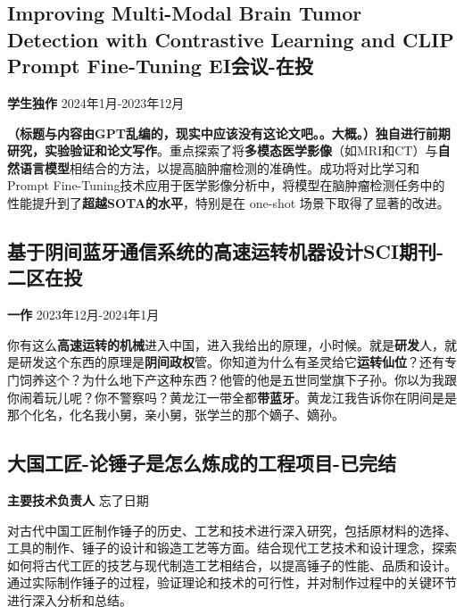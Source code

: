 \documentclass[11pt]{article}
\begin{document}
    \vspace{1em}                %
    \subsection{Improving Multi-Modal Brain Tumor Detection with Contrastive Learning and CLIP Prompt Fine-Tuning \hfill EI会议-在投}

    \textbf{学生独作} \hfill 2024年1月-2023年12月
    
    \textbf{（标题与内容由GPT乱编的，现实中应该没有这论文吧。。大概。）}\textbf{独自进行前期研究，实验验证和论文写作}。重点探索了将\textbf{多模态医学影像}（如MRI和CT）与\textbf{自然语言模型}相结合的方法，以提高脑肿瘤检测的准确性。成功将对比学习和Prompt Fine-Tuning技术应用于医学影像分析中，将模型在脑肿瘤检测任务中的性能提升到了\textbf{超越SOTA的水平}，特别是在 one-shot 场景下取得了显著的改进。

    \vspace{1em}                %
    \subsection{基于阴间蓝牙通信系统的高速运转机器设计\hfill SCI期刊-二区在投}
        
    \textbf{一作} \hfill 2023年12月-2024年1月
    
    你有这么\textbf{高速运转的机械}进入中国，进入我给出的原理，小时候。就是\textbf{研发}人，就是研发这个东西的原理是\textbf{阴间政权}管。你知道为什么有圣灵给它\textbf{运转仙位}？还有专门饲养这个？为什么地下产这种东西？他管的他是五世同堂旗下子孙。你以为我跟你闹着玩儿呢？你不警察吗？黄龙江一带全都\textbf{带蓝牙}。黄龙江我告诉你在阴间是是那个化名，化名我小舅，亲小舅，张学兰的那个嫡子、嫡孙。

    \vspace{1em}
    \subsection{大国工匠-论锤子是怎么炼成的\hfill 工程项目-已完结}
        
    \textbf{主要技术负责人} \hfill 忘了日期
    
    对古代中国工匠制作锤子的历史、工艺和技术进行深入研究，包括原材料的选择、工具的制作、锤子的设计和锻造工艺等方面。结合现代工艺技术和设计理念，探索如何将古代工匠的技艺与现代制造工艺相结合，以提高锤子的性能、品质和设计。通过实际制作锤子的过程，验证理论和技术的可行性，并对制作过程中的关键环节进行深入分析和总结。
\end{document}
